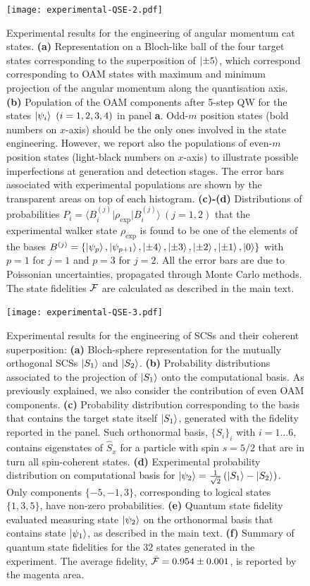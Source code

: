 \begin{figure}[tb]
\texttt{[image: experimental-QSE-2.pdf]}
\caption{
	Experimental results for the engineering of angular momentum cat states.
	\textbf{(a)} Representation on a Bloch-like ball of the four target states corresponding to the superposition of $\ket{\pm 5}$, which correspond corresponding to \ac{OAM} states with maximum and minimum projection of the angular momentum along the quantisation axis.
	\textbf{(b)} Population of the \ac{OAM} components after 5-step {QW} for the states $\ket{\psi_i}~(i=1,2,3,4)$ in panel {\bf a}. Odd-$m$ position states (bold numbers on $x$-axis) should be the only ones involved in the state engineering. However, we report also the populations of even-$m$ position states (light-black numbers on $x$-axis) to illustrate possible imperfections at generation and detection stages. The error bars associated with experimental populations are shown by the transparent areas on top of each histogram.
	\textbf{(c)-(d)} Distributions of probabilities $P_i=\langle B^{(j)}_i\vert\rho_\text{exp}\vert B^{(j)}_i\rangle~(j=1,2)$ that the experimental walker state $\rho_\text{exp}$ is found to be one of the elements of the bases $B^{(j)}=\{\ket{\psi_p},\ket{\psi_{p+1}},\ket{\pm4},\ket{\pm3},\ket{\pm2},\ket{\pm1},\ket{0}\}$ with $p=1$ for $j=1$ and $p=3$ for $j=2$. All the error bars are due to Poissonian uncertainties, propagated through Monte Carlo methods. The state fidelities ${\cal F}$ are calculated as described in the main text.
}
\label{fig:expQWs:results_cat_states}
\end{figure}

\begin{figure}[tb]
\texttt{[image: experimental-QSE-3.pdf]}
\caption{
	Experimental results for the engineering of \acp{SCS} and their coherent superposition:
	\textbf{(a)} Bloch-sphere representation for the mutually orthogonal \acp{SCS} $\ket{S_1}$ and $\ket{S_2}$.
	\textbf{(b)} Probability distributions associated to the projection of $\ket{S_1}$ onto the computational basis. As previously explained, we also consider the contribution of even \ac{OAM} components.
	\textbf{(c)} Probability distribution corresponding to the basis that contains the target state itself $\ket{S_1}$, generated with the fidelity reported in the panel. Such orthonormal basis, $\{S_i\}_i$ with $i=1 ...6$, contains eigenstates of $\hat{S}_x$ for a particle with spin $s=5/2$ that are in turn all spin-coherent states.
	\textbf{(d)} Experimental probability distribution on computational basis for $\ket{\psi_2}=\frac{1}{\sqrt{2}}\left(\ket{S_1}- \ket{S_2} \right)$. Only components $\{-5, -1, 3\}$, corresponding to logical states $\{1,3,5\}$, have non-zero probabilities.
	\textbf{(e)} Quantum state fidelity evaluated measuring state $\ket{\psi_2}$ on the orthonormal basis that contains state $\ket{\psi_1}$, as described in the main text. 
	\textbf{(f)} Summary of quantum state fidelities for the $32$ states generated in the experiment. The average fidelity, $\bar{{\mathcal{F}}}=0.954\pm 0.001$, is reported by the magenta area.
}
\label{fig:VVBs:results_SCS_states}
\end{figure}

